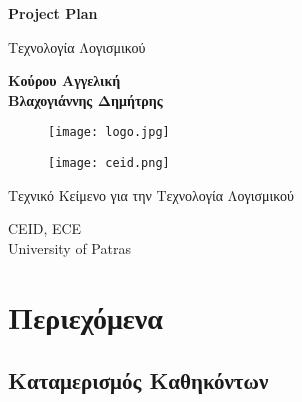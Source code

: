 \documentclass{article}
\begin{document}

\begin{titlepage}
   \begin{center}
       \vspace*{1cm}

       \textbf{\huge Project Plan}

       \vspace{0.3cm}
        Τεχνολογία Λογισμικού
            
       \vspace{0.5cm}

       \textbf{Κούρου Αγγελική \\Βλαχογιάννης Δημήτρης }
       \vspace{0.3cm}
       \begin{figure}[!htb]
        \centering
        \texttt{[image: logo.jpg]}
        \end{figure}
        
        \vspace{0.5cm}
        
        \begin{figure}[!htb]
        \centering
        \texttt{[image: ceid.png]}
        \end{figure}


       \vfill
            
       Τεχνικό Κείμενο για την Τεχνολογία Λογισμικού\\
            
       \vspace{0.5cm}
            
       CEID, ECE\\
       University of Patras\\
            
   \end{center}
\end{titlepage}


{
  \hypersetup{linkcolor=black}
  \tableofcontents
}


\section{Περιεχόμενα}
\subsection{Καταμερισμός Καθηκόντων}
\end{document}
